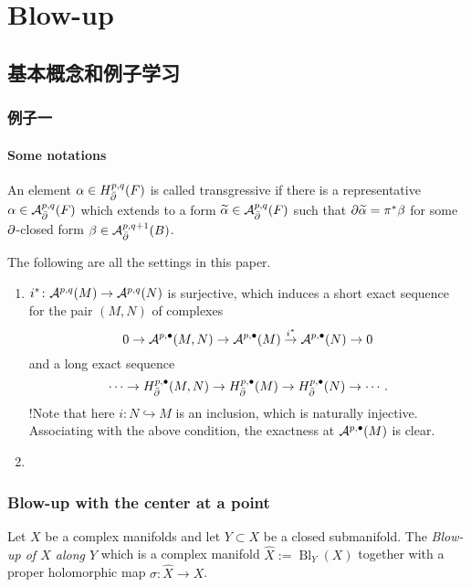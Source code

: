 \chapter{Blow-up}
\section{基本概念和例子学习}
\subsection{例子一}
\subsubsection{Some notations}

\begin{defi}[transgressive]
    An element $\alpha\in H^{p,q}_{\bar\partial}(F)$  is called transgressive if there is a representative $\alpha\in {\mathcal A}^{p,q}_{\bar\partial}(F)$ which extends to a form $\widetilde{\alpha}\in {\mathcal A}^{p,q}_{\bar\partial}(F)$ such that $\partial\widetilde{\alpha}=\pi^*\beta$ for some $\partial$-closed form $\beta\in {\mathcal A}^{p,q+1}_{\bar\partial}(B)$.
\end{defi}

The following are all the settings in this paper.
\begin{enumerate}
    \item $i^*\colon {\mathcal A}^{p,q}(M)\to{\mathcal A}^{p,q}(N)$ is surjective, which induces a short exact sequence for the pair $(M,N)$ of complexes 
    \[
        0\to{\mathcal A}^{p,\bullet}(M,N)\to {\mathcal A}^{p,\bullet}(M)\stackrel{i^*}{\to}{\mathcal A}^{p,\bullet}(N)\to 0
    \]
     and a long exact sequence
     \[
        \cdots\to H^{p,\bullet}_{\bar\partial} (M,N)\to H^{p,\bullet}_{\bar\partial} (M) \to H^{p,\bullet}_{\bar\partial} (N)\to \cdots.
     \]
     !Note that here $i\colon N\hookrightarrow M$ is an inclusion, which is naturally injective. Associating with the above condition, the exactness at ${\mathcal A}^{p,\bullet}(M)$ is clear.
    \item 
\end{enumerate}

\subsection{Blow-up with the center at a point}

\begin{defi}[Blow-up]
    Let $X$ be a complex manifolds and let $Y\subset X$ be a closed submanifold. The \textit{Blow-up of $X$ along $Y$} which is a complex manifold $\widehat{X}:=\operatorname{Bl}_Y (X)$ together with a proper holomorphic map $\sigma\colon \widehat{X}\to X$.
\end{defi}


